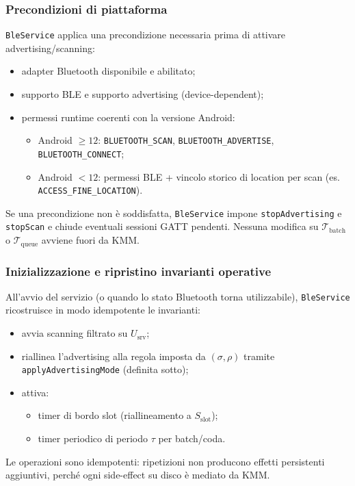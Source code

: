 \documentclass[a4paper,11pt,table,dvipsnames]{article}
\begin{document}
\subsubsection{Precondizioni di piattaforma}
\texttt{BleService} applica una precondizione necessaria prima di attivare advertising/scanning:
\begin{itemize}[nosep]
    \item adapter Bluetooth disponibile e abilitato;
    \item supporto BLE e supporto advertising (device-dependent);
    \item permessi runtime coerenti con la versione Android:
          \begin{itemize}[nosep]
              \item Android \(\ge 12\): \texttt{BLUETOOTH\_SCAN}, \texttt{BLUETOOTH\_ADVERTISE}, \texttt{BLUETOOTH\_CONNECT};
              \item Android \(< 12\): permessi BLE + vincolo storico di location per scan (es. \texttt{ACCESS\_FINE\_LOCATION}).
          \end{itemize}
\end{itemize}
Se una precondizione non è soddisfatta, \texttt{BleService} impone \texttt{stopAdvertising} e \texttt{stopScan} e chiude eventuali sessioni GATT pendenti. Nessuna modifica su \(\mathcal{T}_{\text{batch}}\) o \(\mathcal{T}_{\text{queue}}\) avviene fuori da KMM.

\subsubsection{Inizializzazione e ripristino invarianti operative}
All’avvio del servizio (o quando lo stato Bluetooth torna utilizzabile), \texttt{BleService} ricostruisce in modo idempotente le invarianti:
\begin{itemize}[nosep]
    \item avvia scanning filtrato su \(U_{\text{srv}}\);
    \item riallinea l’advertising alla regola imposta da \((\sigma,\rho)\) tramite \texttt{applyAdvertisingMode} (definita sotto);
    \item attiva:
          \begin{itemize}[nosep]
              \item timer di bordo slot (riallineamento a \(S_{\text{slot}}\));
              \item timer periodico di periodo \(\tau\) per batch/coda.
          \end{itemize}
\end{itemize}
Le operazioni sono idempotenti: ripetizioni non producono effetti persistenti aggiuntivi, perché ogni side-effect su disco è mediato da KMM.
\end{document}
